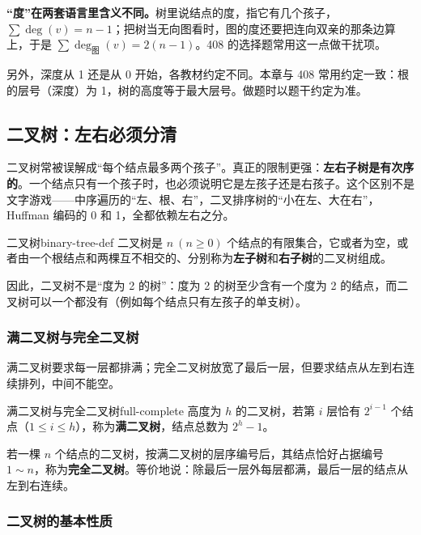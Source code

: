 \begin{attention}
\textbf{“度”在两套语言里含义不同。}树里说结点的度，指它有几个孩子，$\sum \deg(v)=n-1$；把树当无向图看时，图的度还要把连向双亲的那条边算上，于是 $\sum \deg_{\text{图}}(v)=2(n-1)$。408 的选择题常用这一点做干扰项。

另外，深度从 1 还是从 0 开始，各教材约定不同。本章与 408 常用约定一致：根的层号（深度）为 1，树的高度等于最大层号。做题时以题干约定为准。
\end{attention}

\subsection{二叉树：左右必须分清}

二叉树常被误解成“每个结点最多两个孩子”。真正的限制更强：\textbf{左右子树是有次序的}。一个结点只有一个孩子时，也必须说明它是左孩子还是右孩子。这个区别不是文字游戏——中序遍历的“左、根、右”，二叉排序树的“小在左、大在右”，Huffman 编码的 0 和 1，全都依赖左右之分。

\begin{mydef}{二叉树}{binary-tree-def}
二叉树是 $n\ (n\geqslant0)$ 个结点的有限集合，它或者为空，或者由一个根结点和两棵互不相交的、分别称为\textbf{左子树}和\textbf{右子树}的二叉树组成。
\end{mydef}

因此，二叉树不是“度为 2 的树”：度为 2 的树至少含有一个度为 2 的结点，而二叉树可以一个都没有（例如每个结点只有左孩子的单支树）。

\subsubsection{满二叉树与完全二叉树}

满二叉树要求每一层都排满；完全二叉树放宽了最后一层，但要求结点从左到右连续排列，中间不能空。

\begin{mydef}{满二叉树与完全二叉树}{full-complete}
高度为 $h$ 的二叉树，若第 $i$ 层恰有 $2^{i-1}$ 个结点（$1\leqslant i\leqslant h$），称为\textbf{满二叉树}，结点总数为 $2^h-1$。

若一棵 $n$ 个结点的二叉树，按满二叉树的层序编号后，其结点恰好占据编号 $1\sim n$，称为\textbf{完全二叉树}。等价地说：除最后一层外每层都满，最后一层的结点从左到右连续。
\end{mydef}



\subsubsection{二叉树的基本性质}


